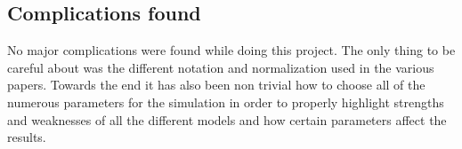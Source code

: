 \subsection{Complications found} %
\label{subsec:complications}

No major complications were found while doing this project. The only thing to be careful about was the different notation and normalization used in the various papers. Towards the end it has also been non trivial how to choose all of the numerous parameters for the simulation in order to properly highlight strengths and weaknesses of all the different models and how certain parameters affect the results.